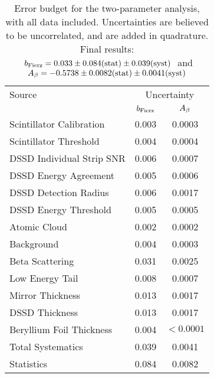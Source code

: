 



\begin{table}[h!!!!t]
	\begin{center}
	\begin{tabular}{ l  c  c  }
		\multicolumn{1}{l}{ Source} 		& \multicolumn{2}{c}{ \;\;\; \;\;\; Uncertainty \;\;\; \;\;\; }   
		\\
		\multicolumn{1}{l}{ } 				& \multicolumn{1}{c}{\;\; $b_{\mathrm{Fierz}}$}   & \multicolumn{1}{c}{$A_{\beta}$}   	
		\\  \hline
		Scintillator Calibration 			& 0.003								& 0.0003											
		\\
		Scintillator Threshold  			& 0.004 							& 0.0004 						
		\\
		DSSD Individual Strip SNR 			& 0.006								& 0.0007													
		\\
		DSSD Energy Agreement	  			& 0.005 							& 0.0006 						
		\\
		DSSD Detection Radius	  			& 0.006 							& 0.0017 						
		\\
		DSSD Energy Threshold	  			& 0.005 							& 0.0005 						
		\\
		Atomic Cloud			  			& 0.002 							& 0.0002 						
		\\
		Background				  			& 0.004 							& 0.0003 						
		\\
		Beta Scattering				  		& 0.031 							& 0.0025 						
		\\
		Low Energy Tail				  		& 0.008 							& 0.0007 						
		\\
		Mirror Thickness				  	& 0.013 							& 0.0017 						
		\\
		DSSD Thickness				 	 	& 0.013 							& 0.0017 						
		\\
		Beryllium Foil Thickness			& 0.004								& $\!\!\!\!\!\! < 0.0001$ 			
		\\  \hline
		\multicolumn{1}{l}{ Total Systematics} & \multicolumn{1}{c}{0.039}  & \multicolumn{1}{c}{0.0041}
		\\
		\multicolumn{1}{l}{ Statistics} 	   & \multicolumn{1}{c}{0.084}  & \multicolumn{1}{c}{0.0082}
	\end{tabular}
	\end{center}
	\caption[Error Budget]{Error budget for the two-parameter analysis, with all data included.  Uncertainties are believed to be uncorrelated, and are added in quadrature.  Final results: 
	$\mbox{ $b_{\mathrm{Fierz}} = 0.033 \pm 0.084(\textrm{stat}) \pm 0.039(\textrm{syst})$ }$ and $\mbox{ $A_{\beta} = -0.5738 \pm 0.0082(\textrm{stat}) \pm 0.0041(\textrm{syst})$ }$ }
	\label{table:budget}
\end{table}




